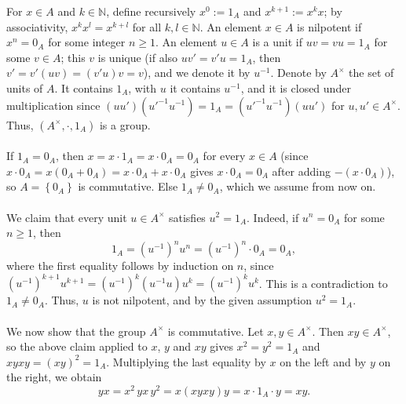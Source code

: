\begin{solution}
    For \( x \in A \) and \( k \in \mathbb{N} \), define recursively \( x^{0} := 1_A \) and \( x^{k+1} := x^{k} x \); by associativity, \( x^{k} x^{l} = x^{k+l} \) for all \( k, l \in \mathbb{N} \). An element \( x \in A \) is nilpotent if \( x^{n} = 0_A \) for some integer \( n \geq 1 \). An element \( u \in A \) is a unit if \( uv = vu = 1_A \) for some \( v \in A \); this \( v \) is unique (if also \( uv' = v'u = 1_A \), then \( v' = v' \left( uv \right) = \left( v'u \right) v = v \)), and we denote it by \( u^{-1} \). Denote by \( A^{\times} \) the set of units of \( A \). It contains \( 1_A \), with \( u \) it contains \( u^{-1} \), and it is closed under multiplication since \( \left( uu' \right) \left( u'^{-1} u^{-1} \right) = 1_A = \left( u'^{-1} u^{-1} \right) \left( uu' \right) \) for \( u, u' \in A^{\times} \). Thus, \( \left( A^{\times}, \cdot, 1_A \right) \) is a group.
    \\\\
    If \( 1_A = 0_A \), then \( x = x \cdot 1_A = x \cdot 0_A = 0_A \) for every \( x \in A \) (since \( x \cdot 0_A = x \left( 0_A + 0_A \right) = x \cdot 0_A + x \cdot 0_A \) gives \( x \cdot 0_A = 0_A \) after adding \( -\left( x \cdot 0_A \right) \)), so \( A = \left\{ 0_A \right\} \) is commutative. Else \( 1_A \neq 0_A \), which we assume from now on.
    \\\\
    We claim that every unit \( u \in A^{\times} \) satisfies \( u^{2} = 1_A \). Indeed, if \( u^{n} = 0_A \) for some \( n \geq 1 \), then
    \[
        1_A = \left( u^{-1} \right)^{n} u^{n} = \left( u^{-1} \right)^{n} \cdot 0_A = 0_A,
    \]
    where the first equality follows by induction on \( n \), since \( \left( u^{-1} \right)^{k+1} u^{k+1} = \left( u^{-1} \right)^{k} \left( u^{-1} u \right) u^{k} = \left( u^{-1} \right)^{k} u^{k} \). This is a contradiction to \( 1_A \neq 0_A \). Thus, \( u \) is not nilpotent, and by the given assumption \( u^{2} = 1_A \).
    \\\\
    We now show that the group \( A^{\times} \) is commutative. Let \( x, y \in A^{\times} \). Then \( xy \in A^{\times} \), so the above claim applied to \( x \), \( y \) and \( xy \) gives \( x^{2} = y^{2} = 1_A \) and \( xyxy = \left( xy \right)^{2} = 1_A \). Multiplying the last equality by \( x \) on the left and by \( y \) on the right, we obtain
    \[
        yx = x^{2} \, yx \, y^{2} = x \left( xyxy \right) y = x \cdot 1_A \cdot y = xy.
\]
\end{solution}
